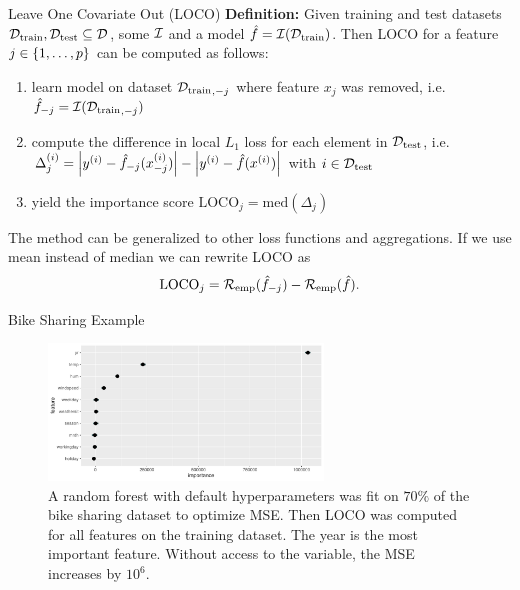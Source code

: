 \documentclass[11pt,compress,t,notes=noshow, aspectratio=169, xcolor=table]{beamer}
\begin{document}
\begin{vbframe}{Leave One Covariate Out (LOCO)  }
%
\textbf{Definition:} Given training and test datasets $\Dtrain, \Dtest \subseteq \D$, some $\inducer$ and a model $\fh = \inducer(\Dtrain)$. Then LOCO for a feature $j \in \pset$ can be computed as follows:
  \begin{enumerate}
    \item learn model on dataset ${\Dtrain}_{,-j}$ where feature $x_j$ was removed, i.e. $\fh_{-j} = \inducer({\Dtrain}_{,-j})$
    \item compute the difference in local $L_1$ loss for each element in $\Dtest$, i.e. $\Delta_j^{(i)} = \left  |y^{(i)} - \fh_{-j}(x_{-j}^{(i)}) \right | - \left |y^{(i)} - \fh(x^{(i)}) \right | $ with $i \in \Dtest$
    \item yield the importance score $\text{LOCO}_j = \text{med} \left ( \Delta_j  \right )$
  \end{enumerate}
\lz 
The method can be generalized to other loss functions and aggregations. If we use mean instead of median we can rewrite LOCO as
%
$$ \text{LOCO}_j = \riske(\fh_{-j}) - \riske(\fh).$$
\end{vbframe}

\begin{vbframe}{Bike Sharing Example}
%
\begin{figure}
  \centering
  \includegraphics[width=0.65\textwidth]{figure_man/bike_sharing_loco.pdf}
\caption{A random forest with default hyperparameters was fit on $70\%$ of the bike sharing dataset to optimize MSE. Then LOCO was computed for all features on the training dataset. The year is the most important feature. Without access to the variable, the MSE increases by $10^6$.}
\end{figure}
%
%
\end{vbframe}
\end{document}
